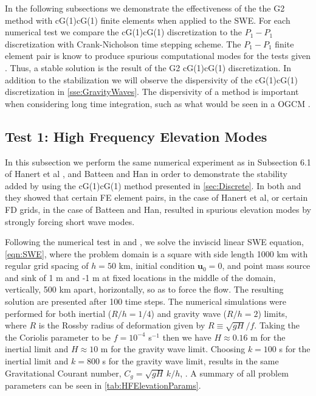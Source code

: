In the following subsections we demonstrate the effectiveness of the the G2
method with cG(1)cG(1) finite elements when applied to the SWE. For each
numerical test we compare the cG(1)cG(1) discretization to the $P_1-P_1$
discretization with Crank-Nicholson time stepping scheme. The $P_1-P_1$ finite
element pair is know to produce spurious computational modes for the tests
given \cite{Le-Roux1998,Hanert2006}. Thus, a stable solution is the result of
the G2 cG(1)cG(1) discretization. In addition to the stabilization we will
observe the dispersivity of the cG(1)cG(1) discretization in
\autoref{sse:GravityWaves}. The dispersivity of a method is important when
considering long time integration, such as what would be seen in a OGCM
\cite{Le_Roux1998}.

\subsection{Test 1: High Frequency Elevation Modes} \label{sse:HFElevModes}
  In this subsection we perform the same numerical experiment as in Subsection
  6.1 of Hanert et al \cite{Hanert2002}, and Batteen and Han \cite{Batteen1981}
  in order to demonstrate the stability added by using the cG(1)cG(1) method
  presented in \autoref{sec:Discrete}. In both \cite{Hanert2002} and
  \cite{Batteen1981} they showed that certain FE element pairs, in the case of
  Hanert et al, or certain FD grids, in the case of Batteen and Han, resulted in
  spurious elevation modes by strongly forcing short wave modes.

  Following the numerical test in \cite{Hanert2002} and \cite{Batteen1981}, we
  solve the inviscid linear SWE equation, \eqref{eqn:SWE}, where the problem domain is
  a square with side length 1000 km with regular grid spacing of $h=50$ km,
  initial condition $\mathbf{u}_0 = 0$, and point mass source and sink of 1 m
  and -1 m at fixed locations in the middle of the domain, vertically, 500 km
  apart, horizontally, so as to force the flow.  The resulting solution are
  presented after 100 time steps. The numerical simulations were performed for
  both inertial ($R/h = 1/4$) and gravity wave ($R/h = 2$) limits, where $R$ is
  the Rossby radius of deformation given by $R \equiv \sqrt{gH}/f$. Taking the
  the Coriolis parameter to be $f = 10^{-4}$ s$^{-1}$ then we have $H \approx
  0.16$ m for the inertial limit and $H \approx 10$ m for the gravity wave
  limit. Choosing $k = 100$ s for the inertial limit and $k = 800$ s for the
  gravity wave limit, results in the same Gravitational Courant number, $C_g =
  \sqrt{gH}\,k/h$, \cite{Le-Roux1998}. A summary of all problem parameters can
  be seen in \autoref{tab:HFElevationParams}.

